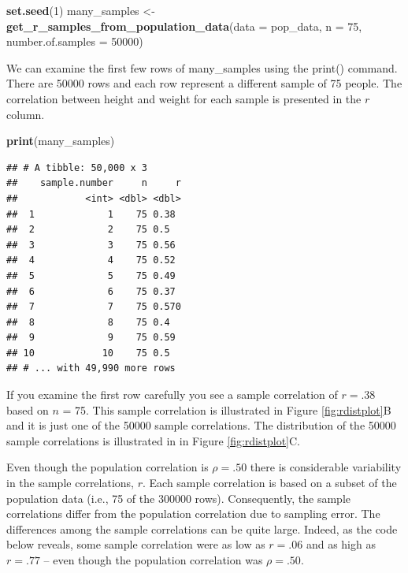 \documentclass[
]{krantz}
\makeatletter
\newenvironment{Shaded}{\begin{snugshade}}{\end{snugshade}}
\newcommand{\DataTypeTok}[1]{\textcolor[rgb]{0.27,0.27,0.27}{#1}}
\newcommand{\DecValTok}[1]{\textcolor[rgb]{0.06,0.06,0.06}{#1}}
\newcommand{\KeywordTok}[1]{\textcolor[rgb]{0.27,0.27,0.27}{\textbf{#1}}}
\newcommand{\NormalTok}[1]{#1}
\newcommand{\StringTok}[1]{\textcolor[rgb]{0.5,0.5,0.5}{#1}}
\newenvironment{kframe}{%
\medskip{}
\setlength{\fboxsep}{.8em}
 \def\at@end@of@kframe{}%
 \ifinner\ifhmode%
  \def\at@end@of@kframe{\end{minipage}}%
  \begin{minipage}{\columnwidth}%
 \fi\fi%
 \def\FrameCommand##1{\hskip\@totalleftmargin \hskip-\fboxsep
 \colorbox{shadecolor}{##1}\hskip-\fboxsep
     \hskip-\linewidth \hskip-\@totalleftmargin \hskip\columnwidth}%
 \MakeFramed {\advance\hsize-\width
   \@totalleftmargin\z@ \linewidth\hsize
   \@setminipage}}%
 {\par\unskip\endMakeFramed%
 \at@end@of@kframe}
\renewenvironment{Shaded}{\begin{kframe}}{\end{kframe}}
\makeatother
\begin{document}
\begin{Shaded}
\begin{Highlighting}[]
\KeywordTok{set.seed}\NormalTok{(}\DecValTok{1}\NormalTok{)}
\NormalTok{many_samples <-}\StringTok{ }\KeywordTok{get_r_samples_from_population_data}\NormalTok{(}\DataTypeTok{data =}\NormalTok{ pop_data,}
                                                   \DataTypeTok{n =} \DecValTok{75}\NormalTok{,}
                                                   \DataTypeTok{number.of.samples =} \DecValTok{50000}\NormalTok{)}
\end{Highlighting}
\end{Shaded}

We can examine the first few rows of many\_samples using the print() command. There are 50000 rows and each row represent a different sample of 75 people. The correlation between height and weight for each sample is presented in the \(r\) column.

\begin{Shaded}
\begin{Highlighting}[]
\KeywordTok{print}\NormalTok{(many_samples)}
\end{Highlighting}
\end{Shaded}

\begin{verbatim}
## # A tibble: 50,000 x 3
##    sample.number     n     r
##            <int> <dbl> <dbl>
##  1             1    75 0.38 
##  2             2    75 0.5  
##  3             3    75 0.56 
##  4             4    75 0.52 
##  5             5    75 0.49 
##  6             6    75 0.37 
##  7             7    75 0.570
##  8             8    75 0.4  
##  9             9    75 0.59 
## 10            10    75 0.5  
## # ... with 49,990 more rows
\end{verbatim}

If you examine the first row carefully you see a sample correlation of \(r = .38\) based on \(n\) = 75. This sample correlation is illustrated in Figure \ref{fig:rdistplot}B and it is just one of the 50000 sample correlations. The distribution of the 50000 sample correlations is illustrated in in Figure \ref{fig:rdistplot}C.

Even though the population correlation is \(\rho = .50\) there is considerable variability in the sample correlations, \(r\). Each sample correlation is based on a subset of the population data (i.e., 75 of the 300000 rows). Consequently, the sample correlations differ from the population correlation due to sampling error. The differences among the sample correlations can be quite large. Indeed, as the code below reveals, some sample correlation were as low as \(r = .06\) and as high as \(r = .77\) -- even though the population correlation was \(\rho = .50\).
\end{document}
